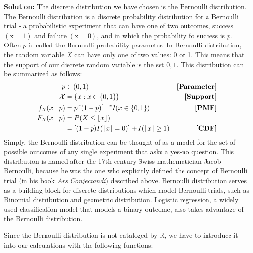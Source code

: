\documentclass{article}\usepackage[]{graphicx}\usepackage[]{color}
\begin{document}
\begin{enumerate}
\begin{enumerate}
\textbf{Solution:} The discrete distribution we have chosen is the Bernoulli distribution. The Bernoulli distribution  is a discrete probability distribution for a Bernoulli trial - a probabilistic experiment that can have one of two outcomes, success $\mathrm{(x = 1)}$ and failure $\mathrm{(x = 0)}$, and in which the probability fo success is $p$. Often $p$  is called the Bernoulli probability parameter. In Bernoulli distribution, the random variable $X$ can have only one of two values: 0 or 1. This means that the support of our discrete random variable is the set $\mathrm{{0, 1}}$. This distribution can be summarized as follows:
\begin{align*}
  p               &\in (0,1)                                                                               &\text{\textbf{[Parameter]}}\\
  \mathcal{X}     & = \{x: x \in \{0,1\}\}                                                                   &\text{\textbf{[Support]}}\\
  f_{X}(x \mid p) & = p^{x} (1-p)^{1-x}I(x \in \{0,1\})                                                      &\text{\textbf{[PMF]}}\\
  F_{X}(x \mid p) & = P(X \leq \left\lfloor x \right\rfloor)\\
                  & = [(1-p)I(\left\lfloor x \right\rfloor = 0)] + I(\left\lfloor x \right\rfloor \geq 1)  &\text{\textbf{[CDF]}}\\
\end{align*}
Simply, the Bernoulli distribution can be thought of as a model for the set of possible outcomes of any single experiment that asks a yes-no question. This distribution is named after the 17th century Swiss mathematician Jacob Bernoulli, because he was the one who explicitly defined the concept of Bernoulli trial (in his book \emph{Ars Conjectandi}) described above. Bernoulli distribution serves as a building block for discrete distributions which model Bernoulli trials, such as Binomial distribution and geometric distribution. Logistic regression, a widely used classification model that models a binary outcome, also takes advantage of the Bernoulli distribution.

Since the Bernoulli distribution is not cataloged by R, we have to introduce it into our calculations with the  following functions:


\end{enumerate}
\end{enumerate}
\end{document}
